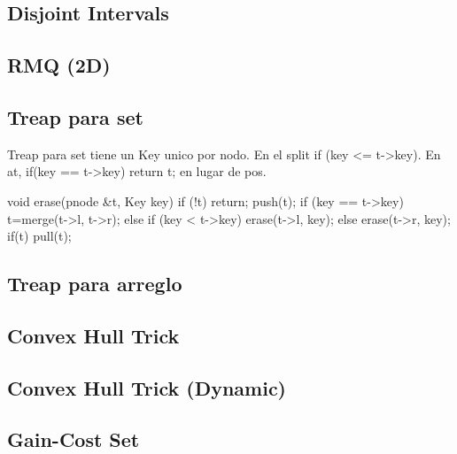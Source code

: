 \subsection{Disjoint Intervals}
\subsection{RMQ (2D)}
\subsection{Treap para set}
Treap para set tiene un Key unico por nodo. En el split if (key \textless = t-\textgreater key). 
En at, if(key == t-\textgreater key) return t; en lugar de pos.
\begin{code}
void erase(pnode &t, Key key) {
    if (!t) return; push(t);
    if (key == t->key) t=merge(t->l, t->r);
    else if (key < t->key) erase(t->l, key);
    else erase(t->r, key);
    if(t) pull(t);}
\end{code}
\subsection{Treap para arreglo}
\subsection{Convex Hull Trick}
\subsection{Convex Hull Trick (Dynamic)}
\subsection{Gain-Cost Set}
